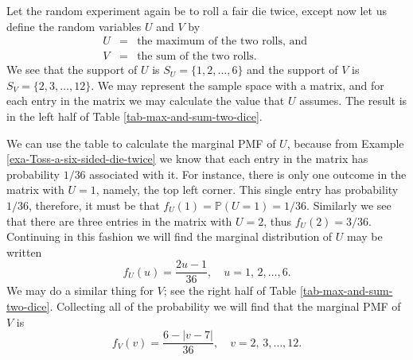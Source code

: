 \documentclass[captions=tableheading]{scrbook}
\begin{document}
\begin{example}

Let the random experiment again be to roll a fair die twice, except now let us define the random variables \(U\) and \(V\) by
\begin{eqnarray*}
U & = & \mbox{the maximum of the two rolls, and }\\
V & = & \mbox{the sum of the two rolls.}
\end{eqnarray*}
We see that the support of \(U\) is \(S_{U}= \{ 1,2,\ldots,6 \} \) and the support of \(V\) is \(S_{V}= \{ 2,3,\ldots,12 \} \). We may represent the sample space with a matrix, and for each entry in the matrix we may calculate the value that \(U\) assumes. The result is in the left half of Table \ref{tab-max-and-sum-two-dice}. 

We can use the table to calculate the marginal PMF of \(U\), because from Example \ref{exa-Toss-a-six-sided-die-twice} we know that each entry in the matrix has probability \(1/36\) associated with it. For instance, there is only one outcome in the matrix with \(U=1\), namely, the top left corner. This single entry has probability \(1/36\), therefore, it must be that \(f_{U}(1)=\mathbb{P}(U=1)=1/36\). Similarly we see that there are three entries in the matrix with \(U=2\), thus \(f_{U}(2)=3/36\). Continuing in this fashion we will find the marginal distribution of \(U\) may be written
\begin{equation}
f_{U}(u)=\frac{2u-1}{36},\quad u=1,\,2,\ldots,6.
\end{equation}
We may do a similar thing for \(V\); see the right half of Table \ref{tab-max-and-sum-two-dice}. Collecting all of the probability we will find that the marginal PMF of \(V\) is
\begin{equation}
f_{V}(v)=\frac{6-|v-7|}{36},\quad v=2,\,3,\ldots,12.
\end{equation}









\end{example}
\end{document}
